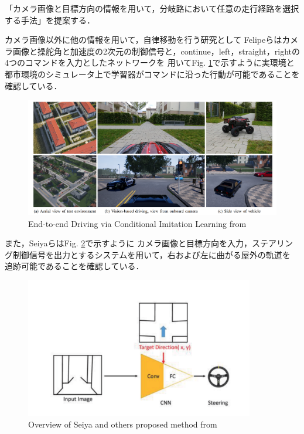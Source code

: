 「カメラ画像と目標方向の情報を用いて，分岐路において任意の走行経路を選択する手法」を提案する．


カメラ画像以外に他の情報を用いて，自律移動を行う研究として
Felipeら\cite{razikon}はカメラ画像と操舵角と加速度の2次元の制御信号と，continue，left，straight，rightの4つのコマンドを入力としたネットワークを
用いてFig. \ref{fig::Conditional_Imitation_Learning}で示すように実環境と都市環境のシミュレータ上で学習器がコマンドに沿った行動が可能であることを
確認している．

\begin{figure}[H]
    \centering
    \includegraphics[width = 15cm]{./figs/End-to-end_Driving_via_Conditional_Imitation_Learning.pdf}
    \caption{End-to-end  Driving  via  Conditional  Imitation  Learning from \cite{razikon}}
    \label{fig::Conditional_Imitation_Learning}
\end{figure}

\newpage
また，Seiyaら\cite{nagoya}はFig. \ref{fig::nagoyaabst}で示すように
カメラ画像と目標方向を入力，ステアリング制御信号を出力とするシステムを用いて，右および左に曲がる屋外の軌道を
追跡可能であることを確認している．

\begin{figure}[H]
    \centering
    \includegraphics[width = 10cm]{./figs/End-to-End_Navigation_with_Branch_Turning_Support_using_Convolutional_Neural_Network_abst.pdf}
    \caption{Overview of Seiya and others proposed method from \cite{nagoya}}
    \label{fig::nagoyaabst}
\end{figure}



